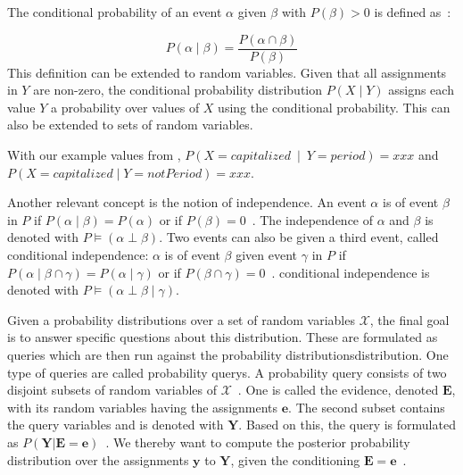 \bigskip

The \gls{conditional probability} of an event $\alpha$ given $\beta$ with $P(\beta)>0$ is defined as~\cite{koller2009probabilistic}:

\begin{equation}
\label{equ:conditional-probability}
P(\alpha\mid\beta) = \frac{P(\alpha\cap\beta)}{P(\beta)}
\end{equation}
This definition can be extended to \glspl{random variable}.
Given that all assignments in $Y$ are non-zero, the \gls{conditional probability distribution} $P(X\mid Y)$ assigns each value $Y$ a probability over values of $X$ using the \gls{conditional probability}.
This can also be extended to sets of \glspl{random variable}.

With our example values from , $P(X=capitalized\ \mid\ Y=period)=xxx$ and $P(X=capitalized\mid Y=notPeriod)=xxx$.

\bigskip

Another relevant concept is the notion of \gls{independence}.
An \gls{event} $\alpha$ is  of \gls{event} $\beta$ in $P$ if $P(\alpha\mid\beta)=P(\alpha)$ or if $P(\beta)=0$~\cite{koller2009probabilistic}.
The \gls{independence} of $\alpha$ and $\beta$ is denoted with $P\models(\alpha\perp\beta)$.
Two \glspl{event} can also be  given a third \gls{event}, called \gls{conditional independence}:
$\alpha$ is  of \gls{event} $\beta$ given \gls{event} $\gamma$ in $P$ if $P(\alpha\mid\beta\cap\gamma)=P(\alpha\mid\gamma)$ or if $P(\beta\cap\gamma)=0$~\cite{koller2009probabilistic}.
\Gls{conditional independence} is denoted with $P\models(\alpha\perp\beta\mid\gamma)$.


Given a \glspl{probability distribution} over a set of \glspl{random variable} $\mathcal{X}$, the final goal is to answer specific questions about this distribution.
These are formulated as queries which are then run against the \glspl{probability distribution}{distribution}.
One type of queries are called \glspl{probability query}.
A \gls{probability query} consists of two disjoint subsets of \glspl{random variable} of $\mathcal{X}$~\citep{koller2009probabilistic}.
One is called the \gls{evidence}, denoted $\bm{E}$, with its \glspl{random variable} having the assignments $\bm{e}$.
The second subset contains the query variables and is denoted with $\bm{Y}$.
Based on this, the query is formulated as $P(\bm{Y}|\bm{E}=\bm{e})$~\citep{koller2009probabilistic}.
We thereby want to compute the posterior \gls{probability distribution} over the assignments $\bm{y}$ to $\bm{Y}$, given the conditioning $\bm{E}=\bm{e}$~\citep{koller2009probabilistic}.

